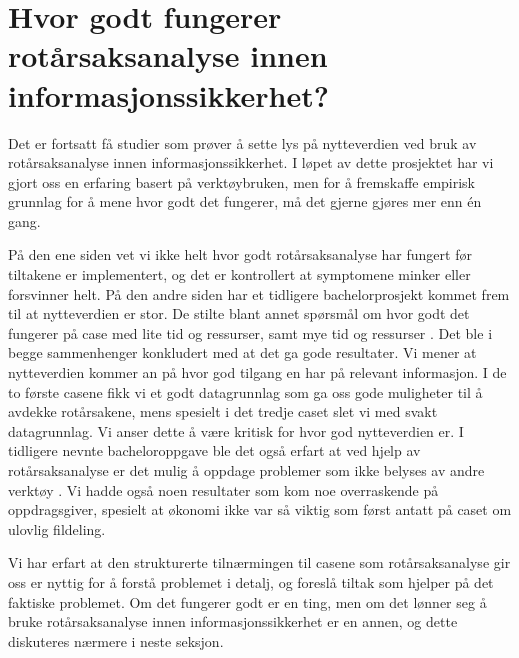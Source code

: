 \section{Hvor godt fungerer rotårsaksanalyse innen informasjonssikkerhet?}
Det er fortsatt få studier som prøver å sette lys på nytteverdien ved bruk av rotårsaksanalyse innen informasjonssikkerhet. I løpet av dette prosjektet har vi gjort oss en erfaring basert på verktøybruken, men for å fremskaffe empirisk grunnlag for å mene hvor godt det fungerer, må det gjerne gjøres mer enn én gang. 

På den ene siden vet vi ikke helt hvor godt rotårsaksanalyse har fungert før tiltakene er implementert, og det er kontrollert at symptomene minker eller forsvinner helt. På den andre siden har et tidligere bachelorprosjekt kommet frem til at nytteverdien er stor. De stilte blant annet spørsmål om hvor godt det fungerer på case med lite tid og ressurser, samt mye tid og ressurser \cite{RCARapport}. Det ble i begge sammenhenger konkludert med at det ga gode resultater. Vi mener at nytteverdien kommer an på hvor god tilgang en har på relevant informasjon. I de to første casene fikk vi et godt datagrunnlag som ga oss gode muligheter til å avdekke rotårsakene, mens spesielt i det tredje caset slet vi med svakt datagrunnlag. Vi anser dette å være kritisk for hvor god nytteverdien er. I tidligere nevnte bacheloroppgave ble det også erfart at ved hjelp av rotårsaksanalyse er det mulig å oppdage problemer som ikke belyses av andre verktøy \cite{RCARapport}. Vi hadde også noen resultater som kom noe overraskende på oppdragsgiver, spesielt at økonomi ikke var så viktig som først antatt på caset om ulovlig fildeling. 

Vi har erfart at den strukturerte tilnærmingen til casene som rotårsaksanalyse gir oss er nyttig for å forstå problemet i detalj, og foreslå tiltak som hjelper på det faktiske problemet. Om det fungerer godt er en ting, men om det lønner seg å bruke rotårsaksanalyse innen informasjonssikkerhet er en annen, og dette diskuteres nærmere i neste seksjon. 


